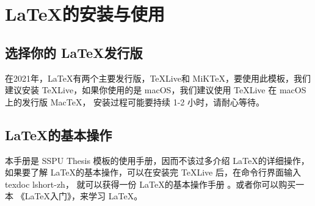 \section{\LaTeX 的安装与使用}

\subsection{选择你的 \LaTeX 发行版}

在2021年，\LaTeX 有两个主要发行版，\TeX Live和 MiK\TeX，要使用此模板，我们建议安装
\TeX Live，如果你使用的是 macOS，我们建议使用 \TeX Live 在 macOS 上的发行版 Mac\TeX，
安装过程可能要持续 1-2 小时，请耐心等待。

\subsection{\LaTeX 的基本操作}

本手册是 SSPU Thesis 模板的使用手册，因而不该过多介绍 \LaTeX 的详细操作，如果要了解
\LaTeX 的基本操作，可以在安装完 \TeX Live 后，在命令行界面输入 {\ttfamily texdoc lshort-zh}，
就可以获得一份 \LaTeX 的基本操作手册 \cite{lshort}。或者你可以购买一本
《\LaTeX 入门》\cite{liu_latex}，来学习 \LaTeX。

\newpage
